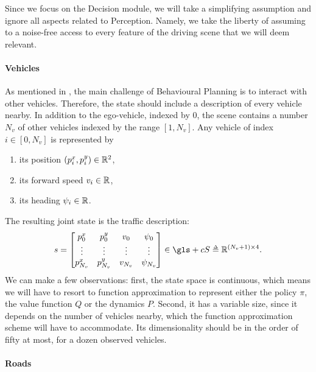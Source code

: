 Since we focus on the Decision module, we will take a simplifying assumption and ignore all aspects related to Perception.
Namely, we take the liberty of assuming to a noise-free access to every feature of the driving scene that we will deem relevant.

\paragraph{Vehicles}

As mentioned in , the main challenge of Behavioural Planning is to interact with other vehicles. Therefore, the state should include a description of every vehicle nearby. In addition to the ego-vehicle, indexed by 0, the scene contains a number $N_v$ of other vehicles indexed by the range $[1, N_v]$.
Any vehicle of index $i\in[0,N_v]$ is represented by 
\begin{enumerate}[label=(\roman*)]
	\item its position $(p^x_{i}, p^y_{i})\in\mathbb{R}^2$,
	\item its forward speed $v_i\in\mathbb{R}$, 
	\item its heading $\psi_i\in\mathbb{R}$.
\end{enumerate}

The resulting joint state is the traffic description: 
\begin{equation}
\label{eq:state-space}
s = \begin{bmatrix}
p^x_{0} & p^y_{0} & v_0 & \psi_0\\
\vdots & \vdots & \vdots & \vdots\\
p^x_{{N_v}} & p^y_{{N_v}} & v_{N_v} & \psi_{N_v}\\
\end{bmatrix}
\in\gls+{cS} \eqdef\Real^{(N_v+1) \times 4}.
\end{equation}
We can make a few observations: first, the state space is continuous, which means we will have to resort to function approximation to represent either the policy $\pi$, the value function $Q$ or the dynamics $P$. Second, it has a variable size, since it depends on the number of vehicles nearby, which the function approximation scheme will have to accommodate. Its dimensionality should be in the order of fifty at most, for a dozen observed vehicles.

\paragraph{Roads}

